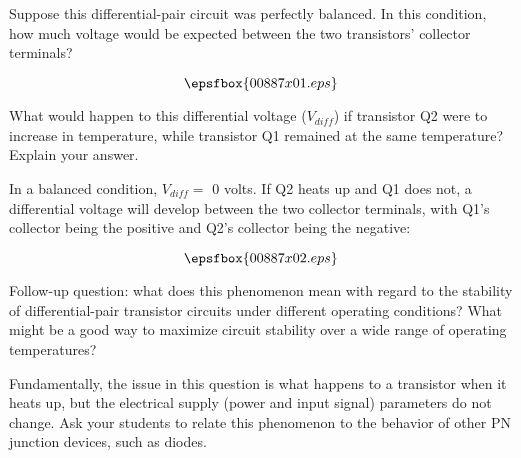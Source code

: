 

Suppose this differential-pair circuit was perfectly balanced.  In this condition, how much voltage would be expected between the two transistors' collector terminals?

$$\epsfbox{00887x01.eps}$$

What would happen to this differential voltage ($V_{diff}$) if transistor Q2 were to increase in temperature, while transistor Q1 remained at the same temperature?  Explain your answer.







In a balanced condition, $V_{diff} =$ 0 volts.  If Q2 heats up and Q1 does not, a differential voltage will develop between the two collector terminals, with Q1's collector being the positive and Q2's collector being the negative:

$$\epsfbox{00887x02.eps}$$

\vskip 10pt

Follow-up question: what does this phenomenon mean with regard to the stability of differential-pair transistor circuits under different operating conditions?  What might be a good way to maximize circuit stability over a wide range of operating temperatures?







Fundamentally, the issue in this question is what happens to a transistor when it heats up, but the electrical supply (power and input signal) parameters do not change.  Ask your students to relate this phenomenon to the behavior of other PN junction devices, such as diodes.




